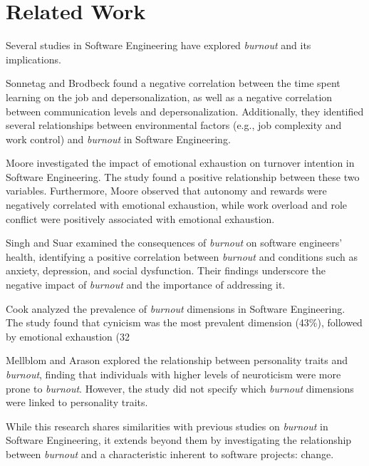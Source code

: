 \section{Related Work}
Several studies in Software Engineering have explored \textit{burnout} and its implications.

Sonnetag and Brodbeck \cite{sonnentag1994stressor} found a negative correlation between the time spent learning on the job and depersonalization, as well as a negative correlation between communication levels and depersonalization. Additionally, they identified several relationships between environmental factors (e.g., job complexity and work control) and \textit{burnout} in Software Engineering.

Moore \cite{moore2000one} investigated the impact of emotional exhaustion on turnover intention in Software Engineering. The study found a positive relationship between these two variables. Furthermore, Moore observed that autonomy and rewards were negatively correlated with emotional exhaustion, while work overload and role conflict were positively associated with emotional exhaustion.

Singh and Suar \cite{singh2013health} examined the consequences of \textit{burnout} on software engineers’ health, identifying a positive correlation between \textit{burnout} and conditions such as anxiety, depression, and social dysfunction. Their findings underscore the negative impact of \textit{burnout} and the importance of addressing it.

Cook \cite{cook2015job} analyzed the prevalence of \textit{burnout} dimensions in Software Engineering. The study found that cynicism was the most prevalent dimension (43\%), followed by emotional exhaustion (32%

Mellblom and Arason \cite{mellblom2019connection} explored the relationship between personality traits and \textit{burnout}, finding that individuals with higher levels of neuroticism were more prone to \textit{burnout}. However, the study did not specify which \textit{burnout} dimensions were linked to personality traits.

While this research shares similarities with previous studies on \textit{burnout} in Software Engineering, it extends beyond them by investigating the relationship between \textit{burnout} and a characteristic inherent to software projects: change.